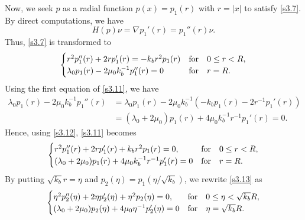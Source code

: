 \documentclass[a4paper,12pt]{article}
\newtheorem{a priori condition}[Th]{A priori condition}
\begin{document}

Now, we seek $p$ as a radial function $p(x)=p_1(r)$ with $r=|x|$ to satisfy \eqref{s3.7}. By direct computations, we have
$$H(p)\nu=\nabla p_1'(r)=p_1''(r)\nu.$$
Thus, \eqref{s3.7} is transformed to 
\begin{equation}\label{s3.11}
\begin{array}{l}
\begin{cases}
r^2 p_1''(r)+2rp_1'(r)=-k_br^2 p_1(r)&\mbox{\rm for}\quad 0\leq r< R,\\
\lambda_0p_1(r)-2\mu_0k_b^{-1}p_1''(r)=0    & {\rm for}\quad r=R.
\end{cases}
\end{array}
\end{equation}
Using the first equation of \eqref{s3.11}, we have
\begin{equation}\label{s3.12}
\begin{aligned}
\lambda_0p_1(r)-2\mu_0k_b^{-1}p_1''(r)&=\lambda_0p_1(r)-2\mu_0k_b^{-1}(-k_bp_1(r)-2r^{-1}p_1'(r))\\
&=(\lambda_0+2\mu_0)p_1(r)+4\mu_0k_b^{-1}r^{-1}p_1'(r)=0.
\end{aligned}
\end{equation}
Hence, using \eqref{s3.12}, \eqref{s3.11} becomes
\begin{equation}\label{s3.13}
\begin{array}{l}
\begin{cases}
r^2 p_1''(r)+2rp_1'(r)+k_br^2 p_1(r)=0,&\mbox{\rm for}\quad 0\leq r< R,\\
(\lambda_0+2\mu_0)p_1(r)+4\mu_0k_b^{-1}r^{-1}p_1'(r)=0    & {\rm for}\quad r=R.
\end{cases}
\end{array}
\end{equation}
By putting $\sqrt{k_b} r=\eta$ and $p_2(\eta)=p_1(\eta/\sqrt{k_b})$, we rewrite \eqref{s3.13} as
\begin{equation}\label{s3.14}
\begin{array}{l}
\begin{cases}
\eta^2 p_2''(\eta)+2\eta p_2'(\eta)+\eta^2 p_2(\eta)=0,&\mbox{\rm for}\quad 0\leq \eta< \sqrt{k_b}R,\\
(\lambda_0+2\mu_0)p_2(\eta)+4\mu_0\eta^{-1}p_2'(\eta)=0    & {\rm for}\quad \eta=\sqrt{k_b}R.
\end{cases}
\end{array}
\end{equation}
\end{document}
